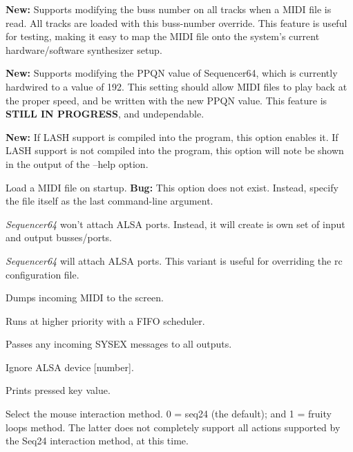       \textbf{New:}
      Supports modifying the buss number on all tracks when a MIDI file is
      read.  All tracks are loaded with this buss-number override.  This
      feature is useful for testing, making it easy to map the MIDI file onto
      the system's current hardware/software synthesizer setup.

      \textbf{New:}
      Supports modifying the PPQN value of Sequencer64, which is currently
      hardwired to a value of 192.  This setting should allow MIDI files to
      play back at the proper speed, and be written with the new PPQN value.
      This feature is \textbf{STILL IN PROGRESS}, and undependable.

      \textbf{New:}
      If LASH support is compiled into the program, this option
      enables it.
      If LASH support is not compiled into the program, this option will note
      be shown in the output of the --help option.

      Load a MIDI file on startup.
      \textbf{Bug:}
      This option does not exist.
      Instead, specify the file itself as the last command-line argument.

      \textsl{Sequencer64} won't attach ALSA ports.
      Instead, it will create is own set of input and output busses/ports.

      \textsl{Sequencer64} will attach ALSA ports.
      This variant is useful for overriding the rc configuration file.

      Dumps incoming MIDI to the screen.

      Runs at higher priority with a FIFO scheduler.

      Passes any incoming SYSEX messages to all outputs.

      Ignore ALSA device [number].

      Prints pressed key value.

      Select the mouse interaction method.
      0 = seq24 (the default); and 1 = fruity loops method.
      The latter does not completely support all actions supported by the Seq24
      interaction method, at this time.

